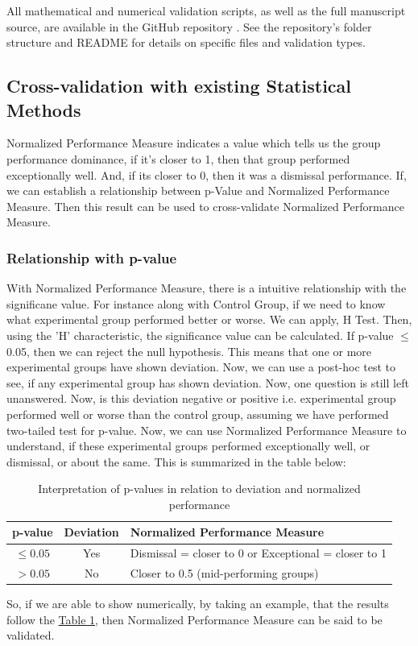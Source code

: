 \documentclass[a4paper,fleqn,review]{cas-sc}
\begin{document}
All mathematical and numerical validation scripts, as well as the full manuscript source, are available in the GitHub repository \cite{silentkarmi2025normalized}. See the repository's folder structure and README for details on specific files and validation types.

\subsection{Cross-validation with existing Statistical Methods}
Normalized Performance Measure indicates a value which tells us the group performance dominance, if it's closer to 1, then that group performed exceptionally well. And, if its closer to 0, then it was a dismissal performance. If, we can establish a relationship between p-Value and Normalized Performance Measure. Then this result can be used to cross-validate Normalized Performance Measure.

\subsubsection{Relationship with p-value}
With Normalized Performance Measure, there is a intuitive relationship with the significane value. For instance along with Control Group, if we need to know what experimental group performed better or worse. We can apply, \cite{kruskal1952use} H Test. Then, using the 'H' characteristic, the significance value can be calculated. If p-value $\le$ 0.05, then we can reject the null hypothesis. This means that one or more experimental groups have shown deviation. Now, we can use a post-hoc \cite{dunnett1955multiple} test to see, if any experimental group has shown deviation. Now, one question is still left unanswered. Now, is this deviation negative or positive i.e. experimental group performed well or worse than the control group, assuming we have performed two-tailed test for p-value. Now, we can use Normalized Performance Measure to understand, if these experimental groups performed exceptionally well, or dismissal, or about the same.
This is summarized in the table below:
\begin{table}[h!tbp]
	\label{table:p-value-relationship}
	\centering
	\begin{tabular}{|c|c|l|}
		\hline
		\textbf{p-value} & \textbf{Deviation} & \textbf{Normalized Performance Measure} \\
		\hline
		$\leq 0.05$ & Yes & Dismissal = closer to 0 or Exceptional = closer to 1 \\
		\hline
		$> 0.05$ & No & Closer to 0.5 (mid-performing groups) \\
		\hline
	\end{tabular}
	\vspace{2pt}
	\caption{Interpretation of p-values in relation to deviation and normalized performance}
	
\end{table}
So, if we are able to show numerically, by taking an example, that the results follow the \hyperref[table:p-value-relationship]{Table 1}, then Normalized Performance Measure can be said to be validated.
\end{document}

